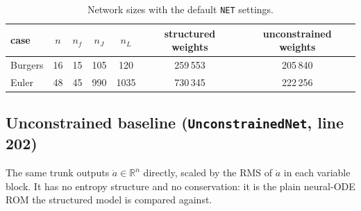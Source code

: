 \documentclass[11pt,a4paper]{article}
\newcommand{\code}[1]{\texttt{\small #1}}
\begin{document}
\begin{table}[h]\centering
\caption{Network sizes with the default \code{NET} settings.}
\begin{tabular}{lcccccc}
\toprule
case & $n$ & $n_f$ & $n_J$ & $n_L$ & structured weights & unconstrained weights\\\midrule
Burgers & 16 & 15 & 105 & 120 & 259\,553 & 205\,840\\
Euler & 48 & 45 & 990 & 1035 & 730\,345 & 222\,256\\
\bottomrule
\end{tabular}
\end{table}

\subsection{Unconstrained baseline (\code{UnconstrainedNet}, line 202)}
The same trunk outputs $\dot a\in\mathbb R^n$ directly, scaled by the RMS of $\dot a$ in each variable block. It has no entropy structure and no conservation: it is the plain neural-ODE ROM the structured model is compared against.
\end{document}
